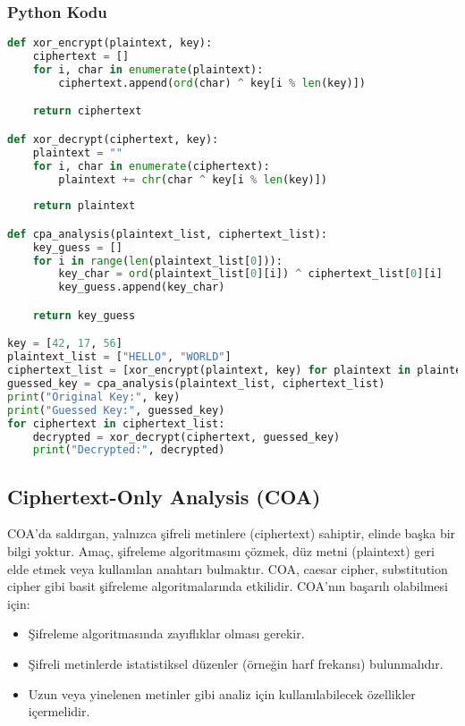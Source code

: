 \subsubsection{Python Kodu}

\begin{lstlisting}[language=Python]
def xor_encrypt(plaintext, key):
    ciphertext = []
    for i, char in enumerate(plaintext):
        ciphertext.append(ord(char) ^ key[i % len(key)])

    return ciphertext

def xor_decrypt(ciphertext, key):
    plaintext = ""
    for i, char in enumerate(ciphertext):
        plaintext += chr(char ^ key[i % len(key)])
    
    return plaintext

def cpa_analysis(plaintext_list, ciphertext_list):
    key_guess = []
    for i in range(len(plaintext_list[0])):
        key_char = ord(plaintext_list[0][i]) ^ ciphertext_list[0][i]
        key_guess.append(key_char)

    return key_guess

key = [42, 17, 56]
plaintext_list = ["HELLO", "WORLD"]
ciphertext_list = [xor_encrypt(plaintext, key) for plaintext in plaintext_list]
guessed_key = cpa_analysis(plaintext_list, ciphertext_list)
print("Original Key:", key)
print("Guessed Key:", guessed_key)
for ciphertext in ciphertext_list:
    decrypted = xor_decrypt(ciphertext, guessed_key)
    print("Decrypted:", decrypted)
\end{lstlisting}

\newpage

\subsection{Ciphertext-Only Analysis (COA)}

COA'da saldırgan, yalnızca şifreli metinlere (ciphertext) sahiptir, elinde başka bir bilgi yoktur. Amaç, şifreleme algoritmasını çözmek, düz metni (plaintext) geri elde etmek veya kullanılan anahtarı bulmaktır. COA, caesar cipher, substitution cipher gibi basit şifreleme algoritmalarında etkilidir. COA'nın başarılı olabilmesi için:

\begin{itemize}
    \item Şifreleme algoritmasında zayıflıklar olması gerekir.
    \item Şifreli metinlerde istatistiksel düzenler (örneğin harf frekansı) bulunmalıdır.
    \item Uzun veya yinelenen metinler gibi analiz için kullanılabilecek özellikler içermelidir.
\end{itemize}

